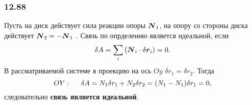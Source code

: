 \subsubsection*{12.88}

Пусть на диск действует сила реакции опоры $\mbox{\boldmath $N$}_1$, на опору со стороны диска действует $\mbox{\boldmath $N$}_2 = - \mbox{\boldmath $N$}_1$ .  Связь по опрделению является идеальной, если
\begin{equation*}
    \delta A = \sum_i \left(
        \mbox{\boldmath $N$}_i \cdot \delta \mbox{\boldmath $r$}_i
    \right) = 0.
\end{equation*}
В рассматриваемой системе в проекцию на ось $Oy$  $\delta r_1 = \delta r_2$. Тогда
\begin{equation*}
    OY: \hspace{0.5cm} 
    \delta A = N_1 \delta r_1 + N_2 \delta r_2 = (N_1 - N_1) \delta r_1 = 0,
\end{equation*}
следовательно \textbf{связь является идеальной}.